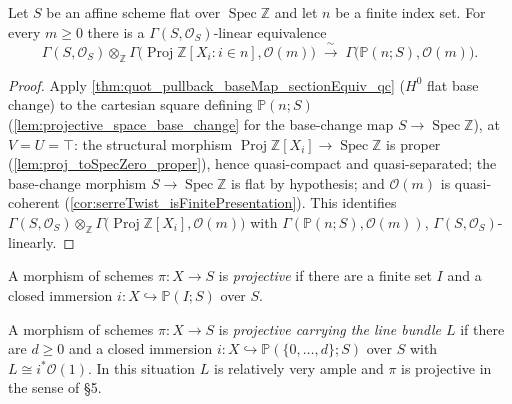 \begin{theorem}\leanok
  \label{thm:serreTwist_sections_baseChange}
  Let \(S\) be an affine scheme flat over \(\operatorname{Spec}
  \mathbb{Z}\) and let \(n\) be a finite index set. For every \(m \ge
  0\) there is a \(\Gamma(S, \mathcal{O}_S)\)-linear equivalence
  \[
    \Gamma(S, \mathcal{O}_S) \otimes_{\mathbb{Z}}
      \Gamma\bigl(\operatorname{Proj} \mathbb{Z}[X_i : i \in n],
      \mathcal{O}(m)\bigr)
    \;\xrightarrow{\ \sim\ }\;
    \Gamma\bigl(\mathbb{P}(n; S), \mathcal{O}(m)\bigr).
  \]
\end{theorem}
\begin{proof}\leanok
  Apply \cref{thm:quot_pullback_baseMap_sectionEquiv_qc} (\(H^0\) flat
  base change) to the cartesian square defining \(\mathbb{P}(n; S)\)
  (\cref{lem:projective_space_base_change} for the base-change map
  \(S \to \operatorname{Spec} \mathbb{Z}\)), at \(V = U = \top\): the
  structural morphism
  \(\operatorname{Proj} \mathbb{Z}[X_i] \to \operatorname{Spec}
  \mathbb{Z}\) is proper (\cref{lem:proj_toSpecZero_proper}), hence
  quasi-compact and quasi-separated; the base-change morphism
  \(S \to \operatorname{Spec} \mathbb{Z}\) is flat by hypothesis; and
  \(\mathcal{O}(m)\) is quasi-coherent
  (\cref{cor:serreTwist_isFinitePresentation}). This identifies
  \(\Gamma(S, \mathcal{O}_S) \otimes_{\mathbb{Z}} \Gamma\bigl(
  \operatorname{Proj} \mathbb{Z}[X_i], \mathcal{O}(m)\bigr)\) with
  \(\Gamma(\mathbb{P}(n; S), \mathcal{O}(m))\), \(\Gamma(S,
  \mathcal{O}_S)\)-linearly.
\end{proof}

\begin{definition}
  \label{def:projective_morphism}
  \leanok
  A morphism of schemes \(\pi : X \to S\) is \emph{projective} if there are a
  finite set \(I\) and a closed immersion
  \(i : X \hookrightarrow \mathbb{P}(I;S)\) over \(S\).
\end{definition}

\begin{definition}
  \label{def:projective_with}
  \leanok
  A morphism of schemes \(\pi : X \to S\) is \emph{projective carrying the
  line bundle \(L\)} if there are \(d \ge 0\) and a closed immersion
  \(i : X \hookrightarrow \mathbb{P}(\{0,\dots,d\}; S)\) over \(S\) with
  \(L \cong i^* \mathcal{O}(1)\).  In this situation \(L\) is relatively
  very ample and \(\pi\) is projective in the sense of \cite{nitsure-hilbert-quot} \S 5.
\end{definition}

